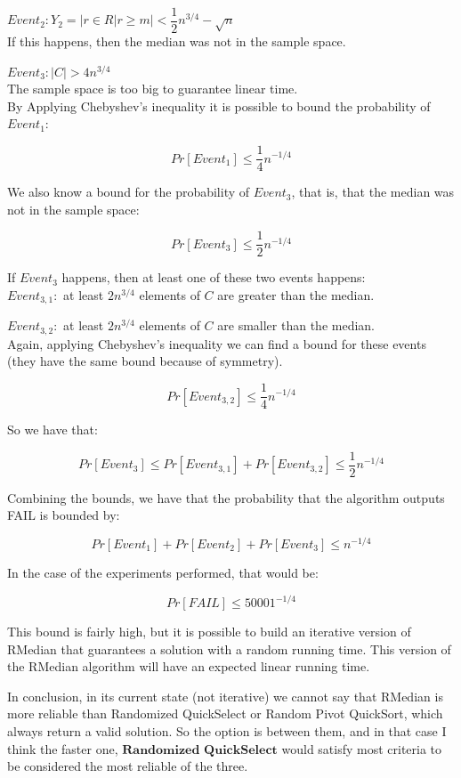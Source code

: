 \documentclass[11pt, oneside]{article}   	%
\begin{document}
$Event_2 : Y_2 = |{r \in R | r \geq m}| < \dfrac{1}{2}n^{3/4} - \sqrt{n}$\\
If this happens, then the median was not in the sample space.

$Event_3 : |C| > 4n^{3/4}$\\
The sample space is too big to guarantee linear time.\\

By Applying Chebyshev's inequality it is possible to bound the probability of $Event_1$:

$$Pr[Event_1] \leq \dfrac{1}{4}n^{-1/4}$$

We also know a bound for the probability of $Event_3$, that is, that the median was not in the sample space:

$$Pr[Event_3] \leq \dfrac{1}{2}n^{-1/4}$$

If $Event_3$ happens, then at least one of these two events happens:\\

$Event_{3,1} :$ at least $2n^{3/4}$ elements of $C$ are greater than the median.

$Event_{3,2} :$ at least $2n^{3/4}$ elements of $C$ are smaller than the median.\\

Again, applying Chebyshev's inequality we can find a bound for these events (they have the same bound because of symmetry).

$$Pr[Event_{3,2}] \leq \dfrac{1}{4}n^{-1/4}$$

So we have that:

$$Pr[Event_3] \leq Pr[Event_{3,1}] + Pr[Event_{3,2}] \leq \dfrac{1}{2}n^{-1/4}$$

Combining the bounds, we have that the probability that the algorithm outputs FAIL is bounded by:

$$Pr[Event_{1}] + Pr[Event_{2}] + Pr[Event_{3}] \leq n^{-1/4}$$

In the case of the experiments performed, that would be:

 $$Pr[FAIL] \leq 50001^{-1/4}$$
 
This bound is fairly high, but it is possible to build an iterative version of RMedian that guarantees a solution with a random running time. This version of the RMedian algorithm will have an expected linear running time.

In conclusion, in its current state (not iterative) we cannot say that RMedian is more reliable than Randomized QuickSelect or Random Pivot QuickSort, which always return a valid solution. So the option is between them, and in that case I think the faster one, $\textbf{Randomized QuickSelect}$ would satisfy most criteria to be considered the most reliable of the three.
\end{document}
